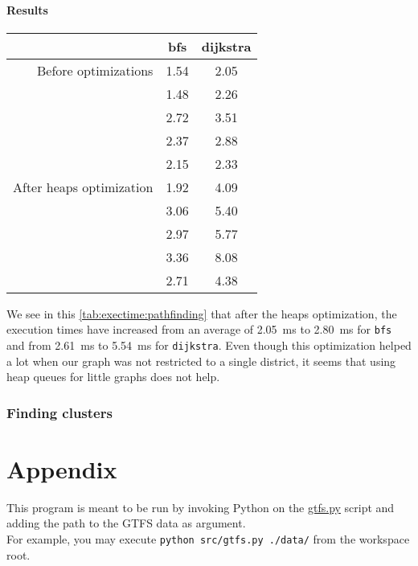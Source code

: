\documentclass[12pt,english]{article}
\makeatletter
\let\old@appendix\appendix
\renewcommand*\appendix{
		\newpage
		\part*{Appendix}\addcontentsline{toc}{part}{Appendix}
		\old@appendix%
	}
\makeatother
\begin{document}
	\subsection{Results}\label{sec:results:2}

	\begin{center}
		\begin{tabular}{r c c}
			& \textbf{\ttfamily bfs} & \textbf{\ttfamily dijkstra}\\
			\hline\hline
			Before optimizations & \num{1.54} & \num{2.05}\\
			& \num{1.48} & \num{2.26}\\
			& \num{2.72} & \num{3.51}\\
			& \num{2.37} & \num{2.88}\\
			& \num{2.15} & \num{2.33}\\
			\hline
			After heaps optimization & \num{1.92} & \num{4.09}\\
			& \num{3.06} & \num{5.40}\\
			& \num{2.97} & \num{5.77}\\
			& \num{3.36} & \num{8.08}\\
			& \num{2.71} & \num{4.38}\\
		\end{tabular}
		\label{tab:exectime:pathfinding}
	\end{center}
	We see in this \autoref{tab:exectime:pathfinding} that after the heaps optimization, the execution times have increased from an average of \SI{2.05}{\milli\second} to \SI{2.80}{\milli\second} for \texttt{bfs} and from \SI{2.61}{\milli\second} to \SI{5.54}{\milli\second} for \texttt{dijkstra}.
	Even though this optimization helped a lot when our graph was not restricted to a single district, it seems that using heap queues for little graphs does not help.

	\section{Finding clusters}\label{sec:step:3}


	\appendix

	This program is meant to be run by invoking Python on the \hyperref[sec:code:gtfs]{\ttfamily gtfs.py} script and adding the path to the GTFS data as argument.\\
	For example, you may execute \texttt{python src/gtfs.py ./data/} from the workspace root.
\end{document}

